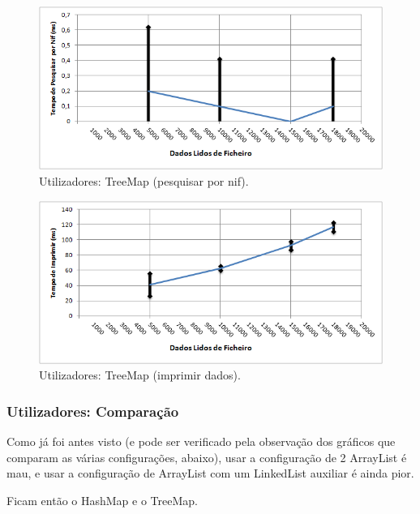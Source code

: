 \documentclass[a5paper,twocolumn, 11pt]{article}
\begin{document}
\begin{figure}[h!b!t!]
    \caption[Utilizadores: TreeMap (pesquisar por nif)]{Utilizadores: TreeMap (pesquisar por nif).}
    \label{hashtable}
    \centering
        \includegraphics[width=400pt]{user_c4_o4.png}
\end{figure}
\begin{figure}[h!b!t!]
    \caption[Utilizadores: TreeMap (imprimir dados)]{Utilizadores: TreeMap (imprimir dados).}
    \label{hashtable}
    \centering
        \includegraphics[width=400pt]{user_c4_o5.png}
\end{figure}




\newpage
\twocolumn
\newpage

\subsubsection[Utilizadores:\\Comparação]{Utilizadores: Comparação}
Como já foi antes visto (e pode ser verificado pela observação dos gráficos que comparam as várias configurações, abaixo), usar a configuração de 2 ArrayList é mau, e usar a configuração de ArrayList com um LinkedList auxiliar é ainda pior.

Ficam então o HashMap e o TreeMap.
\end{document}
